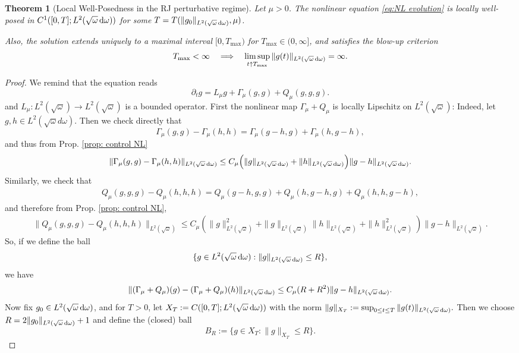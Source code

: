 \documentclass[reqno,11pt,letterpaper]{amsart}
\numberwithin{equation}{section}
\newcommand{\dd}{\, {\rm d}}
\newtheorem{theorem}{Theorem}
\begin{document}
\begin{theorem}[Local Well-Posedness in the RJ perturbative regime]\label{Theo: LWP}
   Let $\mu>0$. The nonlinear equation \eqref{eq:NL evolution} is locally well-posed in $C^1([0,T];L^2(\sqrt{\omega}\dd\omega))$ for some $T= T(\|g_0\|_{L^2(\sqrt{\omega}\dd\omega)}, \mu)$.

Also, the solution extends uniquely to a maximal interval
$[0,T_{\max})$ for $T_{\max}\in(0,\infty]$, and satisfies the blow-up criterion
$$ T_{\max}<\infty \quad\Longrightarrow\quad
    \limsup_{t\uparrow T_{\max}}\|g(t)\|_{L^2(\sqrt{\omega}\dd\omega)}=\infty.$$
\end{theorem}
\begin{proof}
We remind that the equation reads
$$
\partial_t g=L_\mu g+\Gamma_\mu(g,g)+Q_\mu(g,g,g).
$$
and $L_\mu: L^2(\sqrt{\omega}) \to L^2(\sqrt{\omega})$ is a bounded operator.  
First the nonlinear map $\Gamma_\mu+Q_\mu$ is locally Lipschitz on $L^2(\sqrt{\omega})$: Indeed, let $g,h\in L^2(\sqrt{\omega} d\omega)$. Then we check directly that  
$$
\Gamma_\mu(g,g)-\Gamma_\mu(h,h)
=
\Gamma_\mu(g-h,g)+\Gamma_\mu(h,g-h), 
$$
and thus from Prop. \ref{prop: control NL}
\begin{align} 
\label{Lip1}
\|\Gamma_\mu(g,g)-\Gamma_\mu(h,h)\|_{L^2(\sqrt{\omega} \dd\omega ) }
\leq
C_\mu \Big(\|g\|_{L^2(\sqrt{\omega} \dd\omega)}+\|h\|_{L^2(\sqrt{\omega}\dd\omega)} \Big)
\|g-h\|_{L^2(\sqrt{\omega}\dd\omega)}.
\end{align}
Similarly, we check that 
\begin{align*} 
Q_\mu(g,g,g)-Q_\mu(h,h,h) = Q_\mu(g-h,g,g)
+ Q_\mu(h,g-h,g) + Q_\mu(h,h,g-h),
\end{align*}
and therefore from Prop. \ref{prop: control NL}, 
\begin{align} 
\label{Lip2}
\|Q_\mu(g,g,g)-Q_\mu(h,h,h)\|_{L^2(\sqrt{\omega})}
\leq
C_\mu
\left(
\|g\|_{L^2(\sqrt{\omega})}^2+\|g\|_{L^2(\sqrt{\omega})}\|h\|_{L^2(\sqrt{\omega})}+\|h\|_{L^2(\sqrt{\omega})}^2
\right)
\|g-h\|_{L^2(\sqrt{\omega})}.
\end{align}
So, if we define the ball
$$
\{g\in L^2(\sqrt{\omega}\dd\omega):\| g\|_{L^2(\sqrt{\omega} \dd\omega)} \leq R\},
$$
we have
\begin{align} \label{eq:NL_Lipschitz}
\|\mathcal (\Gamma_\mu + Q_\mu)(g)-(\Gamma_\mu +Q_\mu)(h)\|_{L^2(\sqrt{\omega}\dd\omega)}
\le
C_\mu (R+R^2)\|g-h\|_{L^2(\sqrt{\omega}\dd\omega)}.
\end{align}
Now fix $g_0\in L^2(\sqrt{\omega}\dd\omega)$, and for $T>0$, let $ X_T:=C([0,T];L^2(\sqrt{\omega}\dd \omega))$ with the norm $ 
\|g\|_{X_T}:=\sup_{0\le t\leq T}\|g(t)\|_{L^2(\sqrt{\omega} \dd\omega)}.$
Then we choose $ R = 2 \|g_0\|_{L^2(\sqrt{\omega}\dd\omega)} + 1$ and define the (closed) ball
$$
B_R:=\{g\in X_T:\|g\|_{X_T}\le R\}.
$$


\end{proof}
\end{document}
